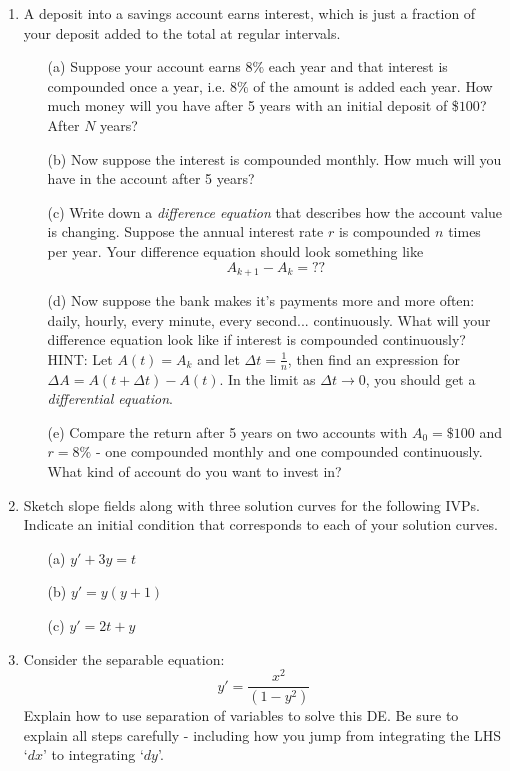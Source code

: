 \documentclass[12pt]{article}
\begin{document}
\begin{enumerate}
\item A deposit into a savings account earns interest, which is just a fraction of your deposit added to the total at regular intervals.  
\begin{itemize}
\item[(a)] Suppose your account earns $8\%$ each year and that interest is compounded once a year, i.e. $8\%$ of the amount is added each year.  How much money will you have after 5 years with an initial deposit of \$$100$?   After $N$ years?
\item[(b)] Now suppose the interest is compounded monthly.  How much will you have in the account after 5 years?
\item[(c)] Write down a \textit{difference equation} that describes how the account value is changing.  Suppose the annual interest rate $r$ is compounded $n$ times per year.  Your difference equation should look something like
$$A_{k+1} - A_k = ??$$
\item[(d)] Now suppose the bank makes it's payments more and more often:  daily, hourly, every minute, every second... continuously.  What will your difference equation look like if interest is compounded continuously?  HINT: Let $A(t) = A_k$ and let $\Delta t = \frac{1}{n}$, then find an expression for $\Delta A = A(t+\Delta t) - A(t)$.  In the limit as $\Delta t \to 0$, you should get a \textit{differential equation}.
\item[(e)] Compare the return after 5 years on two accounts with $A_0 = \$100$ and $r = 8\%$ - one compounded monthly and one compounded continuously.  What kind of account do you want to invest in?
\end{itemize}



\item Sketch slope fields along with three solution curves for the following IVPs.  Indicate an initial condition that corresponds to each of your solution curves.
\begin{multicols}{3}
\begin{itemize}
\item[(a)] $y' + 3y = t$
\item[(b)] $y' = y(y+1)$
\item[(c)] $y' = 2t+y$
\end{itemize}
\end{multicols}

\newpage

\item Consider the separable equation:
$$y' = \frac{x^2}{(1-y^2)}$$
Explain how to use separation of variables to solve this DE.  Be sure to explain all steps carefully - including how you jump from integrating the LHS `$dx$' to integrating `$dy$'.  
\\



\end{enumerate}
\end{document}
